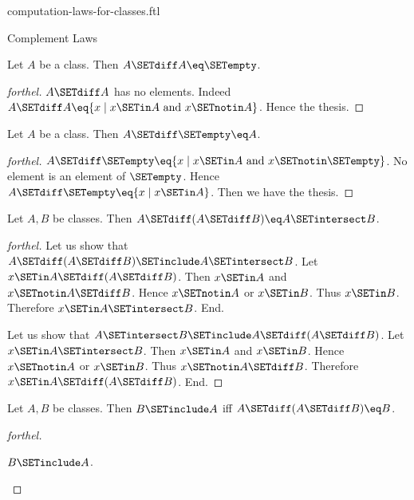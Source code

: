 \documentclass{naproche-library}
\begin{document}
\begin{smodule}[title=Computation Laws For Classes]{computation-laws-for-classes.ftl}
\begin{sfragment}{Complement Laws}
  \begin{proposition}[forthel,id=FOUNDATIONS_02_7433299337150464]
    Let $A$ be a class.
    Then $A \SETdiff A \eq \SETempty$.
  \end{proposition}
  \begin{proof}[forthel]
    $A \SETdiff A$ has no elements.
    Indeed $A \SETdiff A \eq \{ x \mid x \SETin A\text{ and }x \SETnotin A \}$.
    Hence the thesis.
  \end{proof}

  \begin{proposition}[forthel,id=FOUNDATIONS_02_3783696985358336]
    Let $A$ be a class.
    Then $A \SETdiff \SETempty \eq A$.
  \end{proposition}
  \begin{proof}[forthel]
    $A \SETdiff \SETempty \eq \{ x \mid x \SETin A\text{ and }x \SETnotin \SETempty \}$.
    No element is an element of $\SETempty$.
    Hence $A \SETdiff \SETempty \eq \{ x \mid x \SETin A \}$.
    Then we have the thesis.
  \end{proof}

  \begin{proposition}[forthel,id=FOUNDATIONS_02_7083929257377792]
    Let $A, B$ be classes.
    Then $A \SETdiff (A \SETdiff B) \eq A \SETintersect B$.
  \end{proposition}
  \begin{proof}[forthel]
    Let us show that $A \SETdiff (A \SETdiff B) \SETinclude A \SETintersect B$.
      Let $x \SETin A \SETdiff (A \SETdiff B)$.
      Then $x \SETin A$ and $x \SETnotin A \SETdiff B$.
      Hence $x \SETnotin A$ or $x \SETin B$.
      Thus $x \SETin B$.
      Therefore $x \SETin A \SETintersect B$.
    End.

    Let us show that $A \SETintersect B \SETinclude A \SETdiff (A \SETdiff B)$.
      Let $x \SETin A \SETintersect B$.
      Then $x \SETin A$ and $x \SETin B$.
      Hence $x \SETnotin A$ or $x \SETin B$.
      Thus $x \SETnotin A \SETdiff B$.
      Therefore $x \SETin A \SETdiff (A \SETdiff B)$.
    End.
  \end{proof}

  \begin{proposition}[forthel,id=FOUNDATIONS_02_4938646769631232]
    Let $A, B$ be classes.
    Then $B \SETinclude A$ iff $A \SETdiff (A \SETdiff B) \eq B$.
  \end{proposition}
  \begin{proof}[forthel]
    \begin{case}{$B \SETinclude A$.} \end{case}


\end{proof}
\end{sfragment}
\end{smodule}
\end{document}
